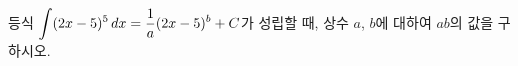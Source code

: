 등식 $\displaystyle\int(2x-5)^5\mkern3mu dx=\dfrac{1}{a}(2x-5)^b+C$가 성립할 때, 상수 $a$, $b$에 대하여 $ab$의 값을 구하시오. 
